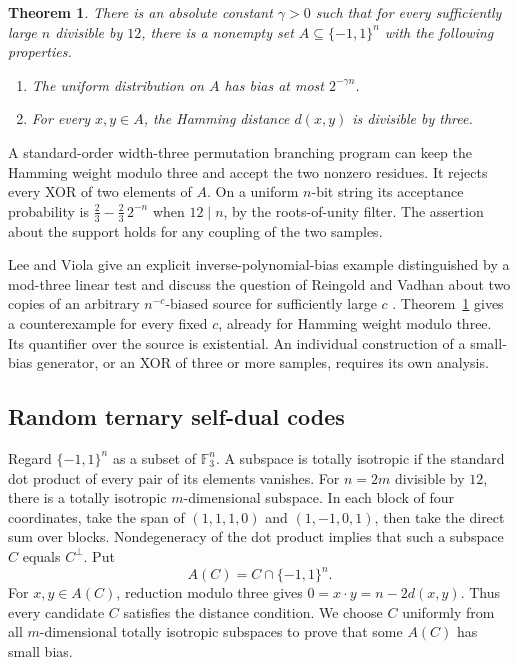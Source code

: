 \documentclass[11pt]{article}
\newtheorem{theorem}{Theorem}
\newcommand{\F}{\mathbb F_3}
\newcommand{\Cube}{\{-1,1\}}
\begin{document}
\begin{theorem}\label{thm:main}
There is an absolute constant $\gamma>0$ such that for every sufficiently
large $n$ divisible by $12$, there is a nonempty set $A\subseteq\Cube^n$
with the following properties.
\begin{enumerate}
\item The uniform distribution on $A$ has bias at most $2^{-\gamma n}$.
\item For every $x,y\in A$, the Hamming distance $d(x,y)$ is divisible by
three.
\end{enumerate}
\end{theorem}

A standard-order width-three permutation branching program can keep the
Hamming weight modulo three and accept the two nonzero residues. It rejects
every XOR of two elements of $A$. On a uniform $n$-bit string its acceptance
probability is $\tfrac23-\tfrac23\,2^{-n}$ when $12\mid n$, by the
roots-of-unity filter. The assertion about the support holds for any
coupling of the two samples.

Lee and Viola give an explicit inverse-polynomial-bias example
distinguished by a mod-three linear test and discuss the question of
Reingold and Vadhan about two copies of an arbitrary $n^{-c}$-biased
source for sufficiently large $c$ \cite[Question~1.2 and
Theorem~1.4(iv)]{LV}. Theorem~\ref{thm:main} gives a counterexample for
every fixed $c$, already for Hamming weight modulo three. Its quantifier
over the source is existential. An individual construction of a
small-bias generator, or an XOR of three or more samples, requires its own
analysis.

\subsection{Random ternary self-dual codes}

Regard $\Cube^n$ as a subset of $\F^n$. A subspace is totally isotropic if
the standard dot product of every pair of its elements vanishes. For
$n=2m$ divisible by $12$, there is a totally isotropic $m$-dimensional
subspace. In each block of four coordinates, take the span of
$(1,1,1,0)$ and $(1,-1,0,1)$, then take the direct sum over blocks.
Nondegeneracy of the dot product implies that such a subspace $C$ equals
$C^\perp$. Put
\[
 A(C)=C\cap\Cube^n.
\]
For $x,y\in A(C)$, reduction modulo three gives
$0=x\cdot y=n-2d(x,y)$. Thus every candidate $C$ satisfies the distance
condition. We choose $C$ uniformly from all $m$-dimensional totally
isotropic subspaces to prove that some $A(C)$ has small bias.
\end{document}
